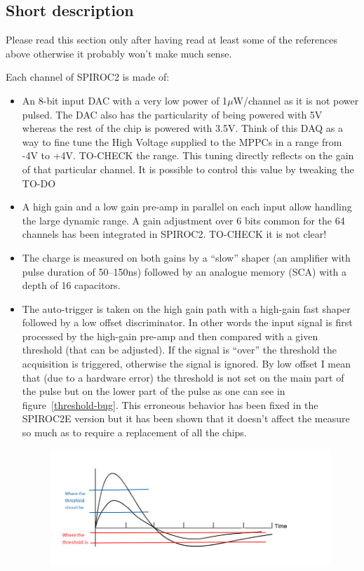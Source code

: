 \subsection{Short description}
Please read this section only after having read at least some of the references
above otherwise it probably won't make much sense.

Each channel of SPIROC2 is made of:
\begin{itemize}
\item An 8-bit input DAC with a very low power of 1$\mu$W/channel as it is not
  power pulsed. The DAC also has the particularity of being powered with 5V
  whereas the rest of the chip is powered with 3.5V. Think of this DAQ as a way
  to fine tune the High Voltage supplied to the MPPCs in a range from -4V to
  +4V. TO-CHECK the range. This tuning directly reflects on the gain of that
  particular channel. It is possible to control this value by tweaking the TO-DO
\item A high gain and a low gain pre-amp in parallel on each input allow
  handling the large dynamic range. A gain adjustment over 6 bits common for the
  64 channels has been integrated in SPIROC2. TO-CHECK it is not clear!
\item The charge is measured on both gains by a ``slow'' shaper (an amplifier
  with pulse duration of 50–150ns) followed by an analogue memory (SCA) with a
  depth of 16 capacitors.
\item The auto-trigger is taken on the high gain path with a high-gain fast
  shaper followed by a low offset discriminator. In other words the input signal
  is first processed by the high-gain pre-amp and then compared with a given
  threshold (that can be adjusted). If the signal is ``over'' the threshold the
  acquisition is triggered, otherwise the signal is ignored. By low offset I
  mean that (due to a hardware error) the threshold is not set on the main part
  of the pulse but on the lower part of the pulse as one can see in
  figure~\ref{threshold-bug}. This erroneous behavior has been fixed in the
  SPIROC2E version but it has been shown that it doesn't affect the measure so
  much as to require a replacement of all the chips.
  \begin{figure}[H]
    \includegraphics[width=\linewidth]{threshold-bug.png}

\end{figure}
\end{itemize}
